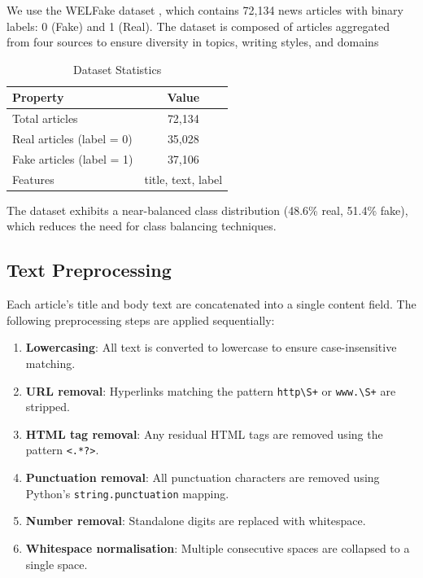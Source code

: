 \documentclass[conference]{IEEEtran}
\begin{document}
We use the WELFake dataset \cite{verma2021welfake}, which contains 72,134 news articles with binary labels: 0 (Fake) and 1 (Real). The dataset is composed of articles aggregated from four sources to ensure diversity in topics, writing styles, and domains

\begin{table}[ht]
\centering
\caption{Dataset Statistics}
\begin{tabular}{lc}
\toprule
Property & Value \\
\midrule
Total articles & 72,134 \\
Real articles (label = 0) & 35,028 \\
Fake articles (label = 1) & 37,106 \\
Features & title, text, label \\
\bottomrule
\end{tabular}
\label{tab:dataset}
\end{table}

The dataset exhibits a near-balanced class distribution (48.6\% real, 51.4\% fake), which reduces the need for class balancing techniques.

\subsection{Text Preprocessing}

Each article's title and body text are concatenated into a single content field. The following preprocessing steps are applied sequentially:

\begin{enumerate}
    \item \textbf{Lowercasing}: All text is converted to lowercase to ensure case-insensitive matching.
    \item \textbf{URL removal}: Hyperlinks matching the pattern \texttt{http\textbackslash S+} or \texttt{www.\textbackslash S+} are stripped.
    \item \textbf{HTML tag removal}: Any residual HTML tags are removed using the pattern \texttt{<.*?>}.
    \item \textbf{Punctuation removal}: All punctuation characters are removed using Python's \texttt{string.punctuation} mapping.
    \item \textbf{Number removal}: Standalone digits are replaced with whitespace.
    \item \textbf{Whitespace normalisation}: Multiple consecutive spaces are collapsed to a single space.
\end{enumerate}
\end{document}
